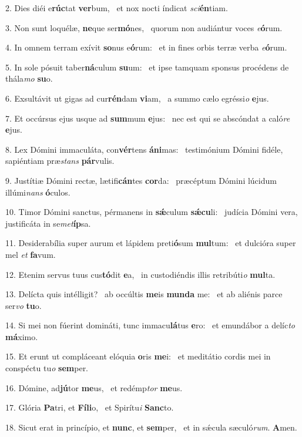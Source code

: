 2. Dies diéi e\textbf{rúc}tat \textbf{ver}bum, \ast\  et nox nocti índicat \textit{sci}\textbf{én}tiam.\

3. Non sunt loquélæ, \textbf{ne}que ser\textbf{mó}nes, \ast\  quorum non audiántur voces \textit{e}\textbf{ó}rum.\

4. In omnem terram exívit \textbf{so}nus e\textbf{ó}rum: \ast\  et in fines orbis terræ verba \textit{e}\textbf{ó}rum.\

5. In sole pósuit taber\textbf{ná}culum \textbf{su}um: \ast\  et ipse tamquam sponsus procédens de thála\textit{mo} \textbf{su}o.\

6. Exsultávit ut gigas ad cur\textbf{rén}dam \textbf{vi}am, \ast\  a summo cælo egréssi\textit{o} \textbf{e}jus.\

7. Et occúrsus ejus usque ad \textbf{sum}mum \textbf{e}jus: \ast\  nec est qui se abscóndat a caló\textit{re} \textbf{e}jus.\

8. Lex Dómini immaculáta, con\textbf{vér}tens \textbf{á}\textbf{ni}mas: \ast\  testimónium Dómini fidéle, sapiéntiam præ\textit{stans} \textbf{pár}vulis.\

9. Justítiæ Dómini rectæ, lætifi\textbf{cán}tes \textbf{cor}da: \ast\  præcéptum Dómini lúcidum illúmi\textit{nans} \textbf{ó}culos.\

10. Timor Dómini sanctus, pérmanens in \textbf{sǽ}culum \textbf{sǽ}\textbf{cu}li: \ast\  judícia Dómini vera, justificáta in se\textit{met}\textbf{íp}sa.\

11. Desiderabília super aurum et lápidem preti\textbf{ó}sum \textbf{mul}tum: \ast\  et dulcióra super mel \textit{et} \textbf{fa}vum.\

12. Etenim servus tuus cus\textbf{tó}dit \textbf{e}a, \ast\  in custodiéndis illis retribúti\textit{o} \textbf{mul}ta.\

13. Delícta quis intélligit? \dag\  ab occúltis \textbf{me}is \textbf{mun}\textbf{da} me: \ast\  et ab aliénis parce ser\textit{vo} \textbf{tu}o.\

14. Si mei non fúerint domináti, tunc immacu\textbf{lá}tus \textbf{e}ro: \ast\  et emundábor a delíc\textit{to} \textbf{má}ximo.\

15. Et erunt ut compláceant elóquia \textbf{o}ris \textbf{me}i: \ast\  et meditátio cordis mei in conspéctu tu\textit{o} \textbf{sem}per.\

16. Dómine, ad\textbf{jú}tor \textbf{me}us, \ast\  et redémp\textit{tor} \textbf{me}us.\

17. Glória \textbf{Pa}tri, et \textbf{Fí}\textbf{li}o, \ast\  et Spirítu\textit{i} \textbf{Sanc}to.\

18. Sicut erat in princípio, et \textbf{nunc}, et \textbf{sem}per, \ast\  et in sǽcula sæculó\textit{rum}. \textbf{A}men.\

